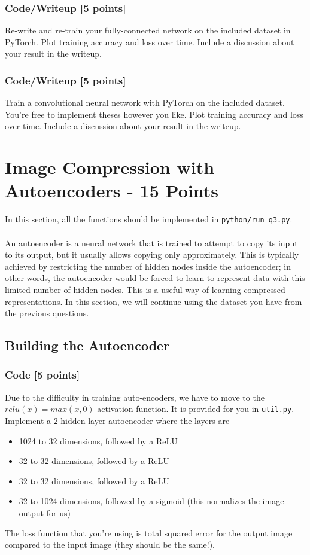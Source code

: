 \documentclass[a4 paper]{article}
\numberwithin{equation}{section}
\newcommand{\0}{\mathbf{0}}
\begin{document}
        \subsubsection{Code/Writeup [5 points]}
        Re-write and re-train your fully-connected network on the included dataset in PyTorch. Plot training accuracy and loss over time. Include a discussion about your result in the writeup.
    
        \subsubsection{Code/Writeup [5 points]}
        Train a convolutional neural network with PyTorch on the included dataset. You're free to implement theses however you like. Plot training accuracy and loss over time. Include a discussion about your result in the writeup.

\newpage
\section{Image Compression with Autoencoders - 15 Points}
    In this section, all the functions should be implemented in \texttt{python/run q3.py}.\\
    \\
    An autoencoder is a neural network that is trained to attempt to copy its input to its output, but it usually allows copying only approximately. This is typically achieved by restricting the number of hidden nodes inside the autoencoder; in other words, the autoencoder would be forced to learn to represent data with this limited number of hidden nodes. This is a useful way of learning compressed representations. In this section, we will continue using the dataset you have from the previous questions.
    
    \subsection{Building the Autoencoder}
        \subsubsection{Code [5 points]}
        Due to the difficulty in training auto-encoders, we have to move to the $relu(x) = max(x, 0)$ activation function. It is provided for you in \texttt{util.py}. Implement a 2 hidden layer autoencoder where the layers are
        \begin{itemize}
            \item 1024 to 32 dimensions, followed by a ReLU
            \item 32 to 32 dimensions, followed by a ReLU
            \item 32 to 32 dimensions, followed by a ReLU
            \item 32 to 1024 dimensions, followed by a sigmoid (this normalizes the image output for us)
        \end{itemize}
        The loss function that you’re using is total squared error for the output image compared to the input image (they should be the same!).
\end{document}
